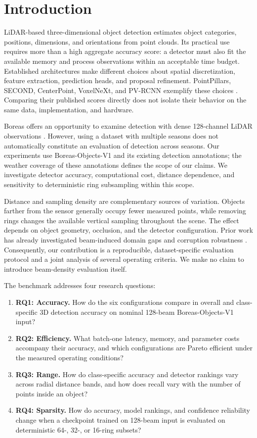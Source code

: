 \documentclass[10pt,twocolumn]{article}
\begin{document}
\section{Introduction}
LiDAR-based three-dimensional object detection estimates object categories, positions, dimensions, and orientations from point clouds. Its practical use requires more than a high aggregate accuracy score: a detector must also fit the available memory and process observations within an acceptable time budget. Established architectures make different choices about spatial discretization, feature extraction, prediction heads, and proposal refinement. PointPillars, SECOND, CenterPoint, VoxelNeXt, and PV-RCNN exemplify these choices \cite{lang2019pointpillars,yan2018second,yin2021centerpoint,chen2023voxelnext,shi2020pvrcnn}. Comparing their published scores directly does not isolate their behavior on the same data, implementation, and hardware.

Boreas offers an opportunity to examine detection with dense 128-channel LiDAR observations \cite{burnett2023boreas}. However, using a dataset with multiple seasons does not automatically constitute an evaluation of detection across seasons. Our experiments use Boreas-Objects-V1 and its existing detection annotations; the weather coverage of these annotations defines the scope of our claims. We investigate detector accuracy, computational cost, distance dependence, and sensitivity to deterministic ring subsampling within this scope.

Distance and sampling density are complementary sources of variation. Objects farther from the sensor generally occupy fewer measured points, while removing rings changes the available vertical sampling throughout the scene. The effect depends on object geometry, occlusion, and the detector configuration. Prior work has already investigated beam-induced domain gaps and corruption robustness \cite{wei2022lidardistillation,griesbacher2025beamdensity,kong2023robo3d,dong2023corruptions}. Consequently, our contribution is a reproducible, dataset-specific evaluation protocol and a joint analysis of several operating criteria. We make no claim to introduce beam-density evaluation itself.

The benchmark addresses four research questions:
\begin{enumerate}
\item \textbf{RQ1: Accuracy.} How do the six configurations compare in overall and class-specific 3D detection accuracy on nominal 128-beam Boreas-Objects-V1 input?
\item \textbf{RQ2: Efficiency.} What batch-one latency, memory, and parameter costs accompany their accuracy, and which configurations are Pareto efficient under the measured operating conditions?
\item \textbf{RQ3: Range.} How do class-specific accuracy and detector rankings vary across radial distance bands, and how does recall vary with the number of points inside an object?
\item \textbf{RQ4: Sparsity.} How do accuracy, model rankings, and confidence reliability change when a checkpoint trained on 128-beam input is evaluated on deterministic 64-, 32-, or 16-ring subsets?
\end{enumerate}
\end{document}
